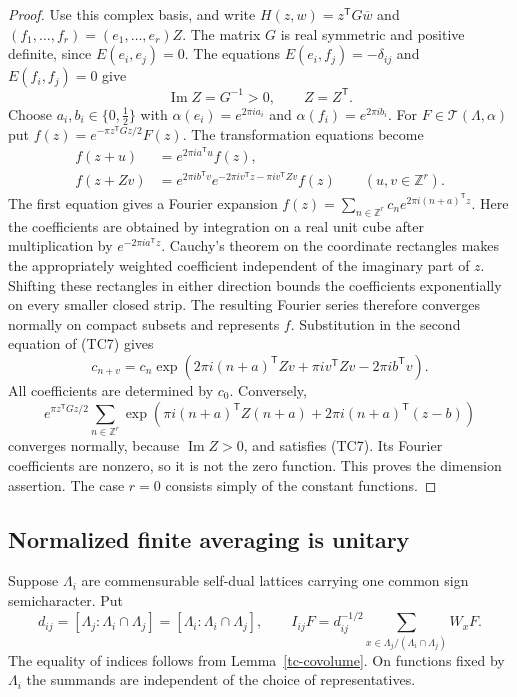 \begin{proof}
Use this complex basis, and write
$H(z,w)=z^{\mathsf T}G\overline w$ and
$(f_1,\ldots,f_r)=(e_1,\ldots,e_r)Z$.
The matrix $G$ is real symmetric and positive definite, since
$E(e_i,e_j)=0$.  The equations
$E(e_i,f_j)=-\delta_{ij}$ and $E(f_i,f_j)=0$ give
\[
             \operatorname{Im}Z=G^{-1}>0,\qquad Z=Z^{\mathsf T}.
 \tag{TC6}
\]
Choose $a_i,b_i\in\{0,\tfrac12\}$ with
$\alpha(e_i)=e^{2\pi ia_i}$ and
$\alpha(f_i)=e^{2\pi ib_i}$.
For $F\in\mathcal T(\Lambda,\alpha)$ put
$f(z)=e^{-\pi z^{\mathsf T}Gz/2}F(z)$.
The transformation equations become
\[
 \begin{split}
 f(z+u)&=e^{2\pi ia^{\mathsf T}u}f(z),\\
 f(z+Zv)&=e^{2\pi ib^{\mathsf T}v}
        e^{-2\pi iv^{\mathsf T}z-\pi iv^{\mathsf T}Zv}f(z)
                 \qquad(u,v\in\mathbb Z^r).
 \end{split}
 \tag{TC7}
\]
The first equation gives a Fourier expansion
$f(z)=\sum_{n\in\mathbb Z^r}c_n
 e^{2\pi i(n+a)^{\mathsf T}z}$.
Here the coefficients are obtained by integration on a real
unit cube after multiplication by $e^{-2\pi ia^{\mathsf T}z}$.
Cauchy's theorem on the coordinate rectangles makes the
appropriately weighted coefficient independent of the imaginary
part of $z$.  Shifting these rectangles in either direction
bounds the coefficients exponentially on every smaller closed
strip.  The resulting Fourier series therefore converges normally
on compact subsets and represents $f$.
Substitution in the second equation of (TC7) gives
\[
 c_{n+v}=c_n
  \exp\!\left(2\pi i(n+a)^{\mathsf T}Zv+
              \pi iv^{\mathsf T}Zv-2\pi ib^{\mathsf T}v\right).
 \tag{TC8}
\]
All coefficients are determined by $c_0$.
Conversely,
\[
 e^{\pi z^{\mathsf T}Gz/2}
 \sum_{n\in\mathbb Z^r}
  \exp\!\left(\pi i(n+a)^{\mathsf T}Z(n+a)
                 +2\pi i(n+a)^{\mathsf T}(z-b)\right)
 \tag{TC9}
\]
converges normally, because $\operatorname{Im}Z>0$, and
satisfies (TC7).  Its Fourier coefficients are nonzero, so it is
not the zero function.  This proves the dimension assertion.
The case $r=0$ consists simply of the constant functions.
\end{proof}

\subsection{Normalized finite averaging is unitary}

Suppose $\Lambda_i$ are commensurable self-dual lattices carrying
one common sign semicharacter.  Put
\[
 d_{ij}=[\Lambda_j:\Lambda_i\cap\Lambda_j]
        =[\Lambda_i:\Lambda_i\cap\Lambda_j],\qquad
 I_{ij}F=d_{ij}^{-1/2}
     \sum_{x\in\Lambda_j/(\Lambda_i\cap\Lambda_j)}W_xF.
 \tag{TC10}
\]
The equality of indices follows from Lemma~\ref{tc-covolume}.
On functions fixed by $\Lambda_i$ the summands are independent
of the choice of representatives.

